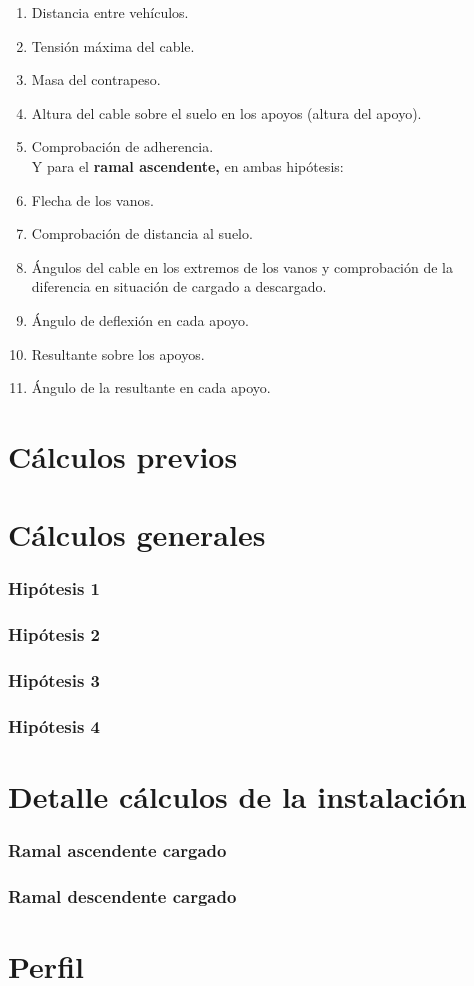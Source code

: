 \documentclass[a4paper,11pt]{article}
\begin{document}
\begin{enumerate}[1)]
\item Distancia entre vehículos.
\item Tensión máxima del cable.
\item Masa del contrapeso.
\item Altura del cable sobre el suelo en los apoyos (altura del apoyo).
\item Comprobación de adherencia.\\
Y para el {\bf ramal ascendente,} en ambas hipótesis:
\item Flecha de los vanos.
\item Comprobación de distancia al suelo.
\item Ángulos del cable en los extremos de los vanos y comprobación de la diferencia en situación de cargado a descargado.
\item Ángulo de deflexión en cada apoyo.
\item Resultante sobre los apoyos.
\item Ángulo de la resultante en cada apoyo.
\end{enumerate}
\part{Cálculos previos}
\part{Cálculos generales}
\section{Hipótesis 1}
\section{Hipótesis 2}
\section{Hipótesis 3}
\section{Hipótesis 4}
\part{Detalle cálculos de la instalación}
\section{Ramal ascendente cargado}
\section{Ramal descendente cargado}
\part{Perfil}
\end{document}

